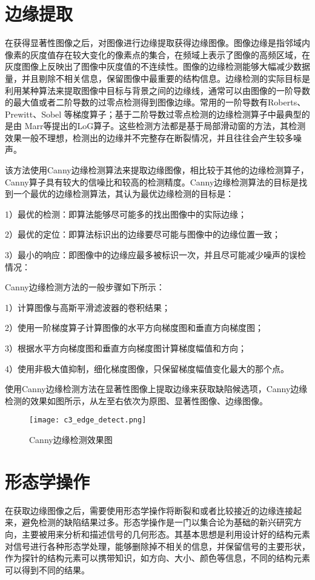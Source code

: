     \section{边缘提取}
    在获得显著性图像之后，对图像进行边缘提取获得边缘图像。图像边缘是指邻域内像素的灰度值存在较大变化的像素点的集合，在频域上表示了图像的高频区域，在灰度图像上反映出了图像中灰度值的不连续性。图像的边缘检测\cite{Gonzalez2010Digital}能够大幅减少数据量，并且剔除不相关信息，保留图像中最重要的结构信息。边缘检测的实际目标是利用某种算法来提取图像中目标与背景之间的边缘线，通常可以由图像的一阶导数的最大值或者二阶导数的过零点检测得到图像边缘。常用的一阶导数有Roberts、Prewitt、Sobel 等\cite{Heath1998Comparison}梯度算子；基于二阶导数过零点检测的边缘检测算子中最典型的是由 Marr等提出的LoG算子\cite{Gonzalez2010Digital}。这些检测方法都是基于局部滑动窗的方法，其检测效果一般不理想，检测出的边缘并不完整存在断裂情况，并且往往会产生较多噪声。

    该方法使用Canny边缘检测算法\cite{Canny1986A}来提取边缘图像，相比较于其他的边缘检测算子，Canny算子具有较大的信噪比和较高的检测精度。Canny边缘检测算法的目标是找到一个最优的边缘检测算法，其认为最优边缘检测的目标是：

    1）最优的检测：即算法能够尽可能多的找出图像中的实际边缘；

    2）最优的定位：即算法标识出的边缘要尽可能与图像中的边缘位置一致；

    3）最小的响应：即图像中的边缘应最多被标识一次，并且尽可能减少噪声的误检情况：

    Canny边缘检测方法的一般步骤如下所示：

    1）计算图像与高斯平滑滤波器的卷积结果；

    2）使用一阶梯度算子计算图像的水平方向梯度图和垂直方向梯度图；

    3）根据水平方向梯度图和垂直方向梯度图计算梯度幅值和方向；

    4）使用非极大值抑制，细化梯度图像，只保留梯度幅值变化最大的那个点。

    使用Canny边缘检测方法在显著性图像上提取边缘来获取缺陷候选项，Canny边缘检测的效果如图所示，从左至右依次为原图、显著性图像、边缘图像。

    \begin{figure*}[!h]
    \centering
    \texttt{[image: c3\_edge\_detect.png]}
    \caption{Canny边缘检测效果图}
    \label{fig:c3_edge_detect}
    \end{figure*}


    \section{形态学操作}
    在获取边缘图像之后，需要使用形态学操作\cite{Gonzalez2010Digital,Wilkinson2009Mathematical}将断裂和或者比较接近的边缘连接起来，避免检测的缺陷结果过多。形态学操作是一门以集合论为基础的新兴研究方向，主要被用来分析和描述信号的几何形态。其基本思想是利用设计好的结构元素对信号进行各种形态学处理，能够删除掉不相关的信息，并保留信号的主要形状，作为探针的结构元素可以携带知识，如方向、大小、颜色等信息，不同的结构元素可以得到不同的结果。

